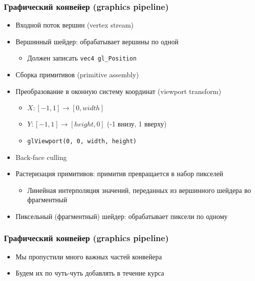 \documentclass{beamer}
\begin{document}
\begin{frame}[fragile]
\frametitle{Графический конвейер (graphics pipeline)}
\begin{itemize}
\pause
\item Входной поток вершин (vertex stream)
\pause
\item Вершинный шейдер: обрабатывает вершины по одной
\begin{itemize}
\item Должен записать \verb|vec4 gl_Position|
\end{itemize}
\pause
\item Сборка примитивов (primitive assembly)
\pause
\item Преобразование в оконную систему координат (viewport transform)
\begin{itemize}
\item \begin{math}X: [-1, 1] \rightarrow [0, width]\end{math}
\item \begin{math}Y: [-1, 1] \rightarrow [height, 0]\end{math} (-1 внизу, 1 вверху)
\item \verb|glViewport(0, 0, width, height)|
\end{itemize}
\pause
\item Back-face culling
\pause
\item Растеризация примитивов: примитив превращается в набор пикселей
\begin{itemize}
\item Линейная интерполяция значений, переданных из вершинного шейдера во фрагментный
\end{itemize}
\pause
\item Пиксельный (фрагментный) шейдер: обрабатывает пиксели по одному
\end{itemize}
\end{frame}

\begin{frame}[fragile]
\frametitle{Графический конвейер (graphics pipeline)}
\begin{itemize}
\item Мы пропустили много важных частей конвейера
\item Будем их по чуть-чуть добавлять в течение курса
\end{itemize}
\end{frame}
\end{document}
